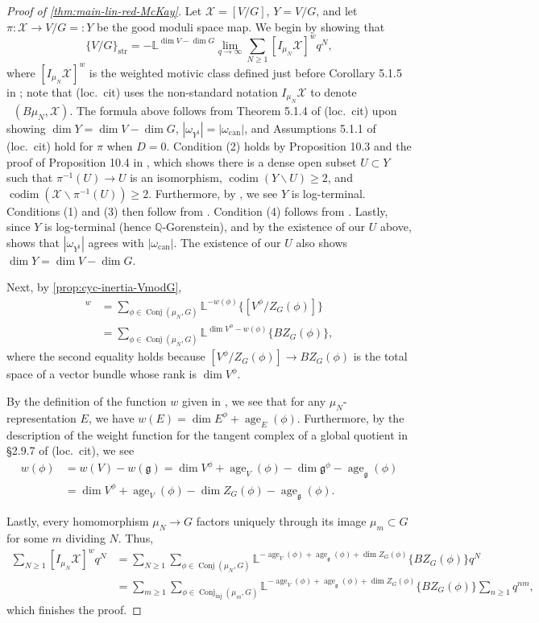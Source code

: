 \documentclass[12pt,a4paper]{amsart}
\theoremstyle{definition}
\renewcommand{\setminus}{\smallsetminus}
\newcommand{\QQ}{\mathbb{Q}}
\newcommand{\cX}{\mathcal{X}}
\newcommand{\bL}{\mathbb{L}}
\newcommand{\g}{\mathfrak{g}}
\newcommand{\str}{\mathrm{str}}
\renewcommand{\1}{\textbf{1}}
\newcommand{\<}{\langle}
\renewcommand{\>}{\rangle}
\DeclareMathOperator{\codim}{codim}
\DeclareMathOperator{\age}{age}
\DeclareMathOperator{\can}{can}
\DeclareMathOperator{\Hom}{Hom}
\DeclareMathOperator{\uHom}{\underline{\Hom}}
\DeclareMathOperator{\Conj}{Conj}
\DeclareMathOperator{\inj}{inj}
\begin{document}
\begin{proof}[Proof of \autoref{thm:main-lin-red-McKay}]
Let $\cX=[V/G]$, $Y=V/G$, and let $\pi\colon \cX\to V/G=:Y$ be the good moduli space map. We begin by showing that
\[
	\{V/G\}_{\str} =-\bL^{\dim V-\dim G}\lim_{q\to\infty} \sum_{N\geq1}[I_{\mu_N}\cX]^w q^N,
\]
where $[I_{\mu_N}\cX]^w$ is the weighted motivic class defined just before Corollary 5.1.5 in \cite{FLW}; note that (loc.~cit) uses the non-standard notation $I_{\mu_N}\cX$ to denote $\uHom(B\mu_N,\cX)$. The formula above follows from Theorem 5.1.4 of (loc.~cit) upon showing $\dim Y=\dim V-\dim G$, $|\omega_{Y^\natural}|=|\omega_{\can}|$, and Assumptions 5.1.1 of (loc.~cit) hold for $\pi$ when $D=0$. Condition (2) holds by Proposition 10.3 and the proof of Proposition 10.4 in \cite{SatrianoUsatine4}, which shows there is a dense open subset $U\subset Y$ such that $\pi^{-1}(U)\to U$ is an isomorphism, $\codim(Y\setminus U)\geq2$, and $\codim(\cX\setminus\pi^{-1}(U))\geq2$. Furthermore, by \cite[Theorem 1.21]{SatrianoUsatine4}, we see $Y$ is log-terminal. Conditions (1) and (3) then follow from \cite[Remark 5.1.2]{FLW}. Condition (4) follows from \cite[Proposition 10.2(2)]{SatrianoUsatine4}. Lastly, since $Y$ is log-terminal (hence $\QQ$-Gorenstein), and by the existence of our $U$ above, \cite[Lemma 6.1.2]{FLW} shows that $|\omega_{Y^\natural}|$ agrees with $|\omega_{\can}|$. The existence of our $U$ also shows $\dim Y=\dim V-\dim G$. 

Next, by \autoref{prop:cyc-inertia-VmodG},
\begin{align*}
	[I_{\mu_N}\cX]^w &= \sum_{\phi\in\Conj(\mu_N,G)} \bL^{-w(\phi)}\{[V^\phi/Z_G(\phi)]\}\\
	&= \sum_{\phi\in\Conj(\mu_N,G)} \bL^{\dim V^\phi-w(\phi)}\{BZ_G(\phi)\},
\end{align*}
where the second equality holds because $[V^\phi/Z_G(\phi)]\to BZ_G(\phi)$ is the total space of a vector bundle whose rank is $\dim V^\phi$.

By the definition of the function $w$ given in \cite[\S2.9.7]{FLW}, we see that for any $\mu_N$-representation $E$, we have $w(E)=\dim E^\phi+\age_E(\phi)$. Furthermore, by the description of the weight function for the tangent complex of a global quotient in \S2.9.7 of (loc.~cit), we see
 \begin{align*}
 w(\phi) &=w(V)-w(\g)= \dim V^\phi+\age_V(\phi)-\dim\g^\phi-\age_\g(\phi)\\
 &=\dim V^\phi+\age_V(\phi)-\dim Z_G(\phi)-\age_\g(\phi).
 \end{align*}

Lastly, every homomorphism $\mu_N\to G$ factors uniquely through its image $\mu_m\subset G$ for some $m$ dividing $N$. Thus, 
\begin{align*}
	\sum_{N\geq1}[I_{\mu_N}\cX]^wq^N &=\sum_{N\geq1}\sum_{\phi\in\Conj(\mu_N,G)} \bL^{-\age_V(\phi)+\age_\g(\phi)+\dim Z_G(\phi)}\{BZ_G(\phi)\}q^N\\
	&=\sum_{m\geq1}\sum_{\phi\in\Conj_{\inj}(\mu_m,G)} \bL^{-\age_V(\phi)+\age_\g(\phi)+\dim Z_G(\phi)}\{BZ_G(\phi)\}\sum_{n\geq1}q^{nm},
\end{align*}
which finishes the proof.
\end{proof}
\end{document}
